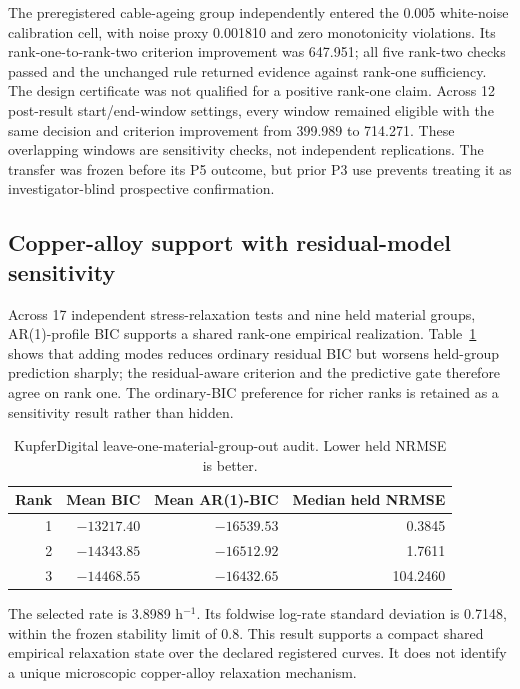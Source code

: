 \documentclass[11pt]{article}
\begin{document}
The preregistered cable-ageing group independently entered the 0.005 white-noise calibration cell, with noise proxy 0.001810 and zero monotonicity violations. Its rank-one-to-rank-two criterion improvement was 647.951; all five rank-two checks passed and the unchanged rule returned evidence against rank-one sufficiency. The design certificate was not qualified for a positive rank-one claim. Across 12 post-result start/end-window settings, every window remained eligible with the same decision and criterion improvement from 399.989 to 714.271. These overlapping windows are sensitivity checks, not independent replications. The transfer was frozen before its P5 outcome, but prior P3 use prevents treating it as investigator-blind prospective confirmation.

\subsection{Copper-alloy support with residual-model sensitivity}
Across 17 independent stress-relaxation tests and nine held material groups, AR(1)-profile BIC supports a shared rank-one empirical realization. Table~\ref{tab:kupfer} shows that adding modes reduces ordinary residual BIC but worsens held-group prediction sharply; the residual-aware criterion and the predictive gate therefore agree on rank one. The ordinary-BIC preference for richer ranks is retained as a sensitivity result rather than hidden.

\begin{table}[H]
\centering
\caption{KupferDigital leave-one-material-group-out audit. Lower held NRMSE is better.}
\label{tab:kupfer}
\begin{tabular}{rrrr}
\toprule
Rank & Mean BIC & Mean AR(1)-BIC & Median held NRMSE\\
\midrule
1 & $-13217.40$ & $-16539.53$ & 0.3845\\
2 & $-14343.85$ & $-16512.92$ & 1.7611\\
3 & $-14468.55$ & $-16432.65$ & 104.2460\\
\bottomrule
\end{tabular}
\end{table}

The selected rate is 3.8989 h$^{-1}$. Its foldwise log-rate standard deviation is 0.7148, within the frozen stability limit of 0.8. This result supports a compact shared empirical relaxation state over the declared registered curves. It does not identify a unique microscopic copper-alloy relaxation mechanism.
\end{document}
